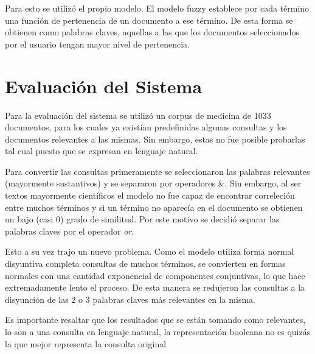 \documentclass[]{article}
\begin{document}
 Para esto se utilizó el propio modelo. El modelo fuzzy establece por cada término una función de pertenencia de un documento a ese término. De esta forma se obtienen como palabras claves, aquellas a las que los documentos seleccionados por el usuario tengan mayor nivel de pertenencia. 

\section{Evaluación del Sistema}
\label{section:eval}
Para la evaluación del sistema se utilizó un corpus de medicina de 1033 documentos, para los cuales ya existían predefinidas algunas consultas y los documentos relevantes a las mismas. Sin embargo, estas no fue posible probarlas tal cual puesto que se expresan en lenguaje natural. 

Para convertir las consultas primeramente se seleccionaron las palabras relevantes (mayormente sustantivos) y se separaron por operadores \&. Sin embargo, al ser textos mayormente científicos el modelo no fue capaz de encontrar correleción entre muchos términos y si un término no aparecía en el documento se obtienen un bajo (casi 0) grado de similitud. Por este motivo se decidió separar las palabras claves por el operador \emph{or}. 

Esto a su vez trajo un nuevo problema. Como el modelo utiliza forma normal disyuntiva completa consultas de muchos términos, se convierten en formas normales con una cantidad exponencial de componentes conjuntivas, lo que hace extremadamente lento el proceso. De esta manera se redujeron las consultas a la disyunción de las 2 o 3 palabras claves más relevantes en la misma.

Es importante resaltar que los resultados que se están tomando como relevantes, lo son a una consulta en lenguaje natural, la representación booleana no es quizás la que mejor representa la consulta original
\end{document}

